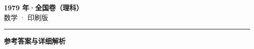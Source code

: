 \documentclass[zihao=5, a4paper]{ctexart}
\begin{document}
\begin{center}
  {\Large\bfseries 1979 年·全国卷（理科）}\\[4pt]
  {\large 数学 · 印刷版}
\end{center}
\medskip
{}

\par\bigskip\hrule\bigskip
{}
\begin{center}{\large\bfseries 参考答案与详细解析}\end{center}
\smallskip

\end{document}
